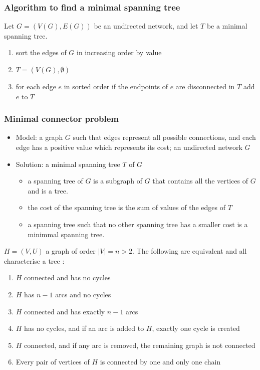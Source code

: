 \documentclass[aspectratio=43]{beamer}
\begin{document}
\begin{frame}\frametitle{Algorithm to find a minimal spanning tree}
Let $G=(V(G),E(G))$ be an undirected network, and let $T$ be a minimal spanning tree.
 
\begin{enumerate}
\item sort the edges of $G$ in increasing order by value
\item $T=(V(G),\emptyset)$
\item for each edge $e$ in sorted order
        if the endpoints of $e$ are disconnected in $T$
        add $e$ to $T$
\end{enumerate}
\end{frame}

\begin{frame}\frametitle{Minimal connector problem}
\begin{itemize}
\item Model: a graph $G$ such that edges represent all possible connections, and each edge has a positive value which represents its cost; 
an undirected network $G$
\item Solution: a  minimal spanning tree $T$ of $G$
\begin{itemize}
\item a spanning tree of $G$ is a subgraph of $G$ that contains all the vertices of $G$ and is a tree.
\item the cost of the spanning tree is the sum of values of the edges of $T$
\item a spanning tree such that no other spanning tree has a smaller cost is a minimmal spanning tree.
\end{itemize}
\end{itemize}
\end{frame}



\begin{frame}
\begin{theorem}\label{th:characterisation_tree}
$H=(V,U)$ a graph of order $|V|=n>2$. The following are equivalent and all characterise a tree :
\begin{enumerate}
\item $H$ connected and has no cycles
\item $H$ has $n-1$ arcs and no cycles
\item $H$ connected and has exactly $n-1$ arcs
\item $H$ has no cycles, and if an arc is added to $H$, exactly one cycle is created
\item $H$ connected, and if any arc is removed, the remaining graph is not
connected
\item Every pair of vertices of $H$ is connected by one and only one chain
\end{enumerate}
\end{theorem}
\end{frame}
\end{document}
